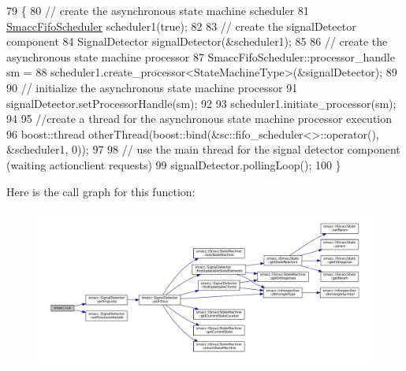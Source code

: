\begin{DoxyCode}
79 \{
80     \textcolor{comment}{// create the asynchronous state machine scheduler}
81     \hyperlink{smacc__fifo__scheduler_8h_a0063e275231c80d5f97df21d17257bf7}{SmaccFifoScheduler} scheduler1(\textcolor{keyword}{true});
82 
83     \textcolor{comment}{// create the signalDetector component}
84     SignalDetector signalDetector(&scheduler1);
85 
86     \textcolor{comment}{// create the asynchronous state machine processor}
87     SmaccFifoScheduler::processor\_handle sm =
88         scheduler1.create\_processor<StateMachineType>(&signalDetector);
89 
90     \textcolor{comment}{// initialize the asynchronous state machine processor}
91     signalDetector.setProcessorHandle(sm);
92 
93     scheduler1.initiate\_processor(sm);
94 
95     \textcolor{comment}{//create a thread for the asynchronous state machine processor execution}
96     boost::thread otherThread(boost::bind(&sc::fifo\_scheduler<>::operator(), &scheduler1, 0));
97 
98     \textcolor{comment}{// use the  main thread for the signal detector component (waiting actionclient requests)}
99     signalDetector.pollingLoop();
100 \}
\end{DoxyCode}
Here is the call graph for this function\+:
\nopagebreak
\begin{figure}[H]
\begin{center}
\leavevmode
\includegraphics[width=350pt]{namespacesmacc_a47ac3b8d2968b1ba4152afd64ab66bd0_cgraph}
\end{center}
\end{figure}
